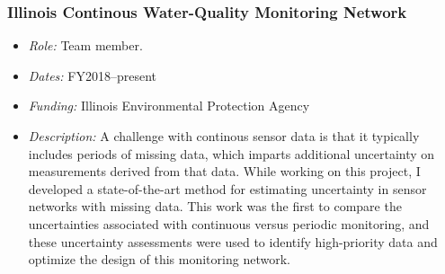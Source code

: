 \documentclass[12pt]{article}
\begin{document}
\subsubsection{Illinois Continous Water-Quality Monitoring Network} \label{Illinois_CWQ}

\begin{itemize}
\item \textit{Role:} Team member.
\item \textit{Dates:} FY2018--present
\item \textit{Funding:} Illinois Environmental Protection Agency
\item \textit{Description:}
  A challenge with continous sensor data is that it typically includes periods of missing data,
  which imparts additional uncertainty on measurements derived from that data.
  While working on this project, I developed a state-of-the-art method for estimating uncertainty in
  sensor networks with missing data.
  This work was the first to compare the uncertainties associated with continuous versus periodic monitoring,
  and these uncertainty assessments were used to identify high-priority data and optimize the design of this monitoring network.
\end{itemize}
\end{document}
